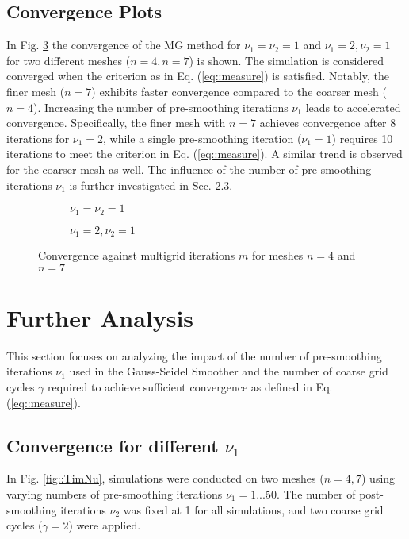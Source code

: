 \documentclass[11pt,a4paper]{article}
\newcommand{\refFig}[1]{Fig. \ref{#1}}
\newcommand{\refEq}[1]{Eq. (\ref{#1})}
\begin{document}
\subsection{Convergence Plots}
In \refFig{fig::Res} the convergence of the MG method for $\nu_1=\nu_2=1$ and  $\nu_1 = 2, \nu_2=1$ for two different meshes ($n=4, n=7$) is shown. The simulation is considered converged when the criterion as in \refEq{eq::measure} is satisfied. Notably, the finer mesh ($n=7$) exhibits faster convergence compared to the coarser mesh ($n=4$). Increasing the number of pre-smoothing iterations $\nu_1$ leads to accelerated convergence. Specifically, the finer mesh with $n=7$ achieves convergence after 8 iterations for $\nu_1 = 2$, while a single pre-smoothing iteration ($\nu_1 = 1$) requires 10 iterations to meet the criterion in \refEq{eq::measure}. A similar trend is observed for the coarser mesh as well. The influence of the number of pre-smoothing iterations $\nu_1$ is further investigated in Sec. 2.3.
\begin{figure}[h!]
	\centering
	\begin{subfigure}[h!]{.49\textwidth}
		\begin{center}
			\resizebox{0.52\width}{!}{}
			\caption{$\nu_1 = \nu_2 = 1$}
			\label{fig::Res1}
		\end{center}	
	\end{subfigure}
	\hfill
	\begin{subfigure}[h!]{.49\textwidth}
		\centering
		\resizebox{0.52\width}{!}{}
		\caption{$\nu_1 = 2,  \nu_2 = 1$}
		\label{fig::Res2}
	\end{subfigure}
	\caption{Convergence against multigrid iterations $m$ for meshes $n=4$ and $n=7$ }
	\label{fig::Res}
\end{figure}

\newpage
\section{Further Analysis}
This section focuses on analyzing the impact of the number of pre-smoothing iterations $\nu_1$ used in the Gauss-Seidel Smoother and the number of coarse grid cycles $\gamma$ required to achieve sufficient convergence as defined in \refEq{eq::measure}.

\subsection{Convergence for different $\nu_1$}
In \refFig{fig::TimNu}, simulations were conducted on two meshes ($n={4, 7}$) using varying numbers of pre-smoothing iterations $\nu_1 = 1...50$. The number of post-smoothing iterations $\nu_2$ was fixed at 1 for all simulations, and two coarse grid cycles ($\gamma = 2$) were applied.
\end{document}
